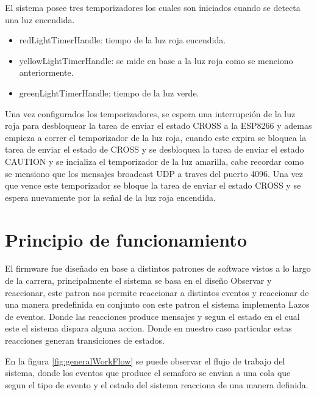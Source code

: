 El sistema posee tres temporizadores los cuales son iniciados cuando se detecta una luz encendida.

\begin{itemize}
\item redLightTimerHandle: tiempo de la luz roja encendida.
\item yellowLightTimerHandle: se mide en base a la luz roja como se menciono anteriormente.
\item greenLightTimerHandle: tiempo de la luz verde.
\end{itemize}

Una vez configurados los temporizadores, se espera una interrupción de la luz roja para desbloquear la tarea de enviar el estado CROSS a la ESP8266 y ademas empieza a correr el temporizador de la luz roja, cuando este expira se bloquea la tarea de enviar el estado de CROSS y se desbloquea la tarea de enviar el estado CAUTION y se incializa el temporizador de la luz amarilla, cabe recordar como se mensiono que los mensajes broadcast UDP  a traves del puerto 4096. Una vez que vence este temporizador se bloque la tarea de enviar el estado CROSS y se espera nuevamente por la señal de la luz roja encendida.

\section{Principio de funcionamiento}
El firmware fue diseñado en base a distintos patrones de software vistos a lo largo de la carrera, principalmente el sistema se basa en el diseño Observar y reaccionar, este patron nos permite reaccionar a distintos eventos y reaccionar de una manera predefinida en conjunto con este patron el sistema implementa Lazos de eventos. Donde las reacciones produce mensajes y segun el estado en el cual este el sistema dispara alguna accion. Donde en nuestro caso particular estas reacciones generan transiciones de estados.

En la figura \ref{fig:generalWorkFlow} se puede observar el flujo de trabajo del sistema, donde los eventos que produce el semaforo se envian a una cola que segun el tipo de evento y el estado del sistema reacciona de una manera definida.

